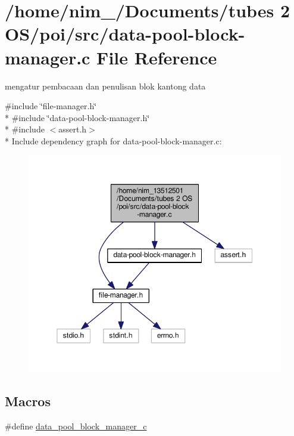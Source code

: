 \hypertarget{data-pool-block-manager_8c}{\section{/home/nim\-\_/\-Documents/tubes 2 O\-S/poi/src/data-\/pool-\/block-\/manager.c File Reference}
\label{data-pool-block-manager_8c}
}


mengatur pembacaan dan penulisan blok kantong data  


{\ttfamily \#include \char`\"{}file-\/manager.\-h\char`\"{}}\\*
{\ttfamily \#include \char`\"{}data-\/pool-\/block-\/manager.\-h\char`\"{}}\\*
{\ttfamily \#include $<$assert.\-h$>$}\\*
Include dependency graph for data-\/pool-\/block-\/manager.c\-:\nopagebreak
\begin{figure}[H]
\begin{center}
\leavevmode
\includegraphics[width=350pt]{data-pool-block-manager_8c__incl}
\end{center}
\end{figure}
\subsection*{Macros}
\begin{DoxyCompactItemize}
\item 
\#define \hyperlink{data-pool-block-manager_8c_acc334690346a1892e11c892ed27f70e7}{data\-\_\-pool\-\_\-block\-\_\-manager\-\_\-c}
\end{DoxyCompactItemize}
